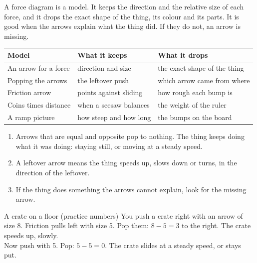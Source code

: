 \label{ch6}

A force diagram is a model. It keeps the direction and the relative size of each force, and it drops the exact shape of the thing, its colour and its parts. It is good when the arrows explain what the thing did. If they do not, an arrow is missing.

\begin{center}
\sffamily\small\renewcommand{\arraystretch}{1.5}
\begin{tabular}{@{}p{3.4cm}p{3.7cm}p{3.7cm}@{}}
\toprule
\textbf{Model} & \textbf{What it keeps} & \textbf{What it drops}\\
\midrule
An arrow for a force & direction and size & the exact shape of the thing\\
Popping the arrows & the leftover push & which arrow came from where\\
Friction arrow & points against sliding & how rough each bump is\\
Coins times distance & when a seesaw balances & the weight of the ruler\\
A ramp picture & how steep and how long & the bumps on the board\\
\bottomrule
\end{tabular}
\end{center}

\begin{enumerate}[leftmargin=1.6em,itemsep=0.2em]
\item Arrows that are equal and opposite pop to nothing. The thing keeps doing what it was doing: staying still, or moving at a steady speed.
\item A leftover arrow means the thing speeds up, slows down or turns, in the direction of the leftover.
\item If the thing does something the arrows cannot explain, look for the missing arrow.
\end{enumerate}

\begin{worked}{A crate on a floor (practice numbers)}
You push a crate right with an arrow of size 8. Friction pulls left with size 5. Pop them: $8-5=3$ to the right. The crate speeds up, slowly.\\
Now push with 5. Pop: $5-5=0$. The crate slides at a steady speed, or stays put.
\end{worked}

